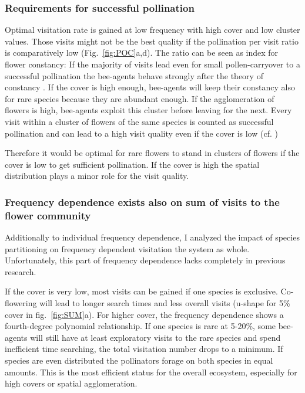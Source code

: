 \subsubsection*{Requirements for successful pollination}
Optimal visitation rate is gained at low frequency with high cover and low cluster values. Those visits might not be the best quality if the pollination per visit ratio is comparatively low (Fig.~\ref{fig:POC}a,d). 
The ratio can be seen as index for flower constancy: If the majority of visits lead even for small pollen-carryover to a successful pollination the bee-agents behave strongly after the theory of constancy \citep{montgomery2009pollen}. If the cover is high enough, bee-agents will keep their constancy also for rare species because they are abundant enough. If the agglomeration of flowers is high, bee-agents exploit this cluster before leaving for the next. Every visit within a cluster of flowers of the same species is counted as successful pollination and can lead to a high visit quality even if the cover is low (cf. \citealt{jakobsson2009relationships})

Therefore it would be optimal for rare flowers to stand in clusters of flowers if the cover is low to get sufficient pollination. If the cover is high the spatial distribution plays a minor role for the visit quality.  

\subsubsection*{Frequency dependence exists also on sum of visits to the flower community}

Additionally to individual frequency dependence, I analyzed the impact of species partitioning on frequency dependent visitation the system as whole. Unfortunately, this part of frequency dependence lacks completely in previous research. 

If the cover is very low, most visits can be gained if one species is exclusive. Co-flowering will lead to longer search times and less overall visits (u-shape for 5\% cover in fig.~\ref{fig:SUM}a). For higher cover, the frequency dependence shows a fourth-degree polynomial relationship. If one species is rare at 5-20\%, some bee-agents will still have at least exploratory visits to the rare species and spend inefficient time searching, the total visitation number drops to a minimum. If species are even distributed the pollinators forage on both species in equal amounts. This is the most efficient status for the overall ecosystem, especially for high covers or spatial agglomeration. 

